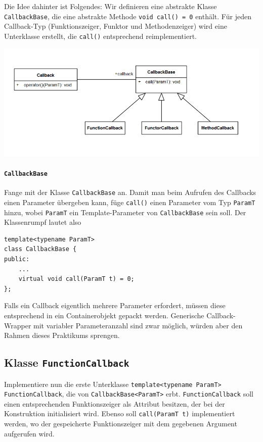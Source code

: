 Die Idee dahinter ist Folgendes:
Wir definieren eine abstrakte Klasse \lstinline{CallbackBase}, die eine abstrakte Methode \lstinline{void call() = 0} enthält.
Für jeden Callback-Typ (Funktionszeiger, Funktor und Methodenzeiger) wird eine Unterklasse erstellt, die \lstinline{call()} entsprechend reimplementiert.

\begin{center}
\includegraphics[width=.7\textwidth]{figures/callback_metamodel.png}
\end{center}

\paragraph*{\lstinline{CallbackBase}}

Fange mit der Klasse \lstinline{CallbackBase} an.
Damit man beim Aufrufen des Callbacks einen Parameter übergeben kann, füge \lstinline{call()} einen Parameter vom Typ \lstinline{ParamT} hinzu, wobei \lstinline{ParamT} ein Template-Parameter von \lstinline{CallbackBase} sein soll.
Der Klassenrumpf lautet also

\begin{lstlisting}
template<typename ParamT>
class CallbackBase {
public:
	...
	virtual void call(ParamT t) = 0;
};
\end{lstlisting}

Falls ein Callback eigentlich mehrere Parameter erfordert, müssen diese entsprechend in ein Containerobjekt gepackt werden.
Generische Callback-Wrapper mit variabler Parameteranzahl sind zwar möglich, würden aber den Rahmen dieses Praktikums sprengen.


\subsection{Klasse \lstinline{FunctionCallback}}
Implementiere nun die erste Unterklasse \lstinline{template<typename ParamT> FunctionCallback}, die von \lstinline{CallbackBase<ParamT>} erbt.
\lstinline{FunctionCallback} soll einen entsprechenden Funktionszeiger als Attribut besitzen, der bei der Konstruktion initialisiert wird.
Ebenso soll \lstinline{call(ParamT t)} implementiert werden, wo der gespeicherte Funktionszeiger mit dem gegebenen Argument aufgerufen wird.

